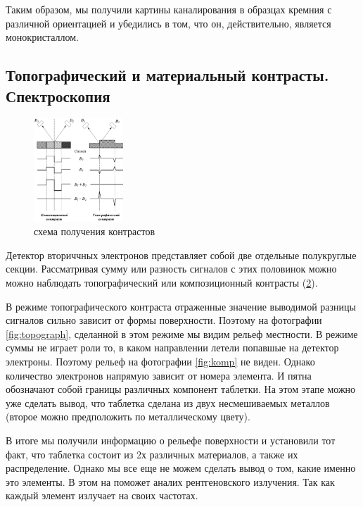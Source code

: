 \documentclass[a4paper,12pt]{article}
\begin{document}
\begin{figure}[h]
\begin{minipage}{.5\textwidth}
  \label{fig:Si007}
\end{minipage}
\end{figure}

Таким образом, мы получили картины каналирования в образцах кремния с различной ориентацией и убедились в том, что он, действительно, является монокристаллом.


\subsection{Топографический и материальный контрасты. Спектроскопия}
\begin{figure} 
    
    \includegraphics[width=0.30\textwidth]{контраст.png}
    \caption{схема получения контрастов}
    \label{contr}
\end{figure}
Детектор вториччных электронов представляет собой две отдельные  полукруглые секции. Рассматривая сумму или разность сигналов с этих половинок можно можно наблюдать топографический или композиционный контрасты (\ref{contr}).

В режиме топографического контраста отраженные значение выводимой разницы сигналов сильно зависит от формы поверхности. Поэтому на фотографии \ref{fig:topograph}, сделанной в этом режиме мы видим рельеф местности. В режиме суммы не играет роли то, в каком направлении летели попавшые на детектор электроны. Поэтому рельеф на фотографии \ref{fig:komp} не виден. Однако количество электронов напрямую зависит от номера элемента. И пятна обозначают собой границы различных компонент таблетки. На этом этапе можно уже сделать вывод, что таблетка сделана из двух несмешиваемых металлов (второе можно предположить по металлическому цвету).


В итоге мы получили информацию о рельефе поверхности и установили тот факт, что таблетка состоит из 2х различных материалов, а также их распределение. Однако мы все еще не можем сделать вывод о том, какие именно это элементы. В этом на поможет аналих рентгеновского излучения. Так как каждый элемент излучает на своих частотах.
\end{document}
